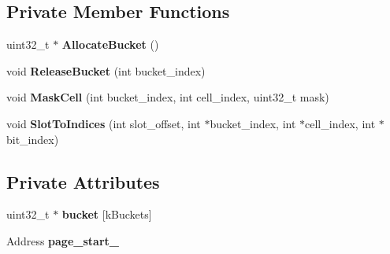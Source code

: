 \subsection*{Private Member Functions}
\begin{DoxyCompactItemize}
\item 
uint32\+\_\+t $\ast$ {\bfseries Allocate\+Bucket} ()\hypertarget{classv8_1_1internal_1_1_slot_set_ab27aadebe62b23603ff26e09756394d0}{}\label{classv8_1_1internal_1_1_slot_set_ab27aadebe62b23603ff26e09756394d0}

\item 
void {\bfseries Release\+Bucket} (int bucket\+\_\+index)\hypertarget{classv8_1_1internal_1_1_slot_set_a673899e9aac52338b4e9e12828be2bd8}{}\label{classv8_1_1internal_1_1_slot_set_a673899e9aac52338b4e9e12828be2bd8}

\item 
void {\bfseries Mask\+Cell} (int bucket\+\_\+index, int cell\+\_\+index, uint32\+\_\+t mask)\hypertarget{classv8_1_1internal_1_1_slot_set_af435bf654d081eb39e54770b8d1bdcda}{}\label{classv8_1_1internal_1_1_slot_set_af435bf654d081eb39e54770b8d1bdcda}

\item 
void {\bfseries Slot\+To\+Indices} (int slot\+\_\+offset, int $\ast$bucket\+\_\+index, int $\ast$cell\+\_\+index, int $\ast$bit\+\_\+index)\hypertarget{classv8_1_1internal_1_1_slot_set_a50133dc28e8a330dc2eadf571874f8b7}{}\label{classv8_1_1internal_1_1_slot_set_a50133dc28e8a330dc2eadf571874f8b7}

\end{DoxyCompactItemize}
\subsection*{Private Attributes}
\begin{DoxyCompactItemize}
\item 
uint32\+\_\+t $\ast$ {\bfseries bucket} \mbox{[}k\+Buckets\mbox{]}\hypertarget{classv8_1_1internal_1_1_slot_set_ac458de603c7ef53a8215c96ecbb4dfe2}{}\label{classv8_1_1internal_1_1_slot_set_ac458de603c7ef53a8215c96ecbb4dfe2}

\item 
Address {\bfseries page\+\_\+start\+\_\+}\hypertarget{classv8_1_1internal_1_1_slot_set_a88e74fff31e859bff2f50dbafc58de35}{}\label{classv8_1_1internal_1_1_slot_set_a88e74fff31e859bff2f50dbafc58de35}

\end{DoxyCompactItemize}
